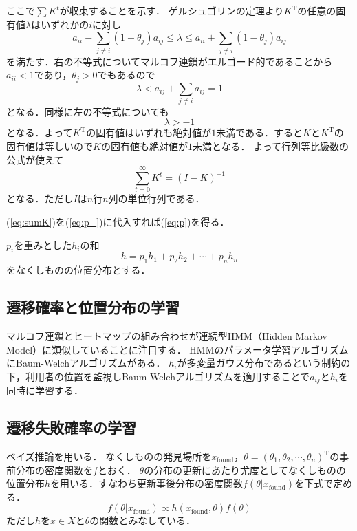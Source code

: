 \begin{theorem}
    ここで$ \sum K^t $が収束することを示す．
    ゲルシュゴリンの定理\cite{bib:s_saito}より$ K^\mathrm{T} $の任意の固有値$ \lambda $はいずれかの$ i $に対し
    \begin{equation*}
        a_{i i} - \sum_{j \ne i}(1 - \theta_j) a_{i j} \le \lambda \le a_{i i} + \sum_{j \ne i}(1 - \theta_j) a_{i j}
    \end{equation*}
    を満たす．右の不等式についてマルコフ連鎖がエルゴード的であることから$ a_{i i} < 1 $\cite{bib:funaki}であり，$ \theta_j > 0 $でもあるので
    \begin{equation*}
        \lambda < a_{i j} + \sum_{j \ne i} a_{i j} = 1
    \end{equation*}
    となる．同様に左の不等式についても
    \begin{equation*}
        \lambda > -1
    \end{equation*}
    となる．よって$ K^\mathrm{T} $の固有値はいずれも絶対値が$ 1 $未満である．すると$ K $と$ K^\mathrm{T} $の固有値は等しいので$ K $の固有値も絶対値が$ 1 $未満となる．
    よって行列等比級数の公式\cite{bib:m_saito}が使えて
    \begin{equation} \label{eq:sumK}
        \sum_{t=0}^{\infty} K^t = (I - K)^{-1}
    \end{equation}
    となる．ただし$ I $は$ n $行$ n $列の単位行列である．

    (\ref{eq:sumK})を(\ref{eq:p_})に代入すれば(\ref{eq:p})を得る．\QED
\end{theorem}

$ p_i $を重みとした$ h_i $の和
\begin{equation} \label{eq:h}
    h = p_1 h_1 + p_2 h_2 + \cdots + p_n h_n
\end{equation}
をなくしものの位置分布とする．

\subsection{遷移確率と位置分布の学習}
マルコフ連鎖とヒートマップの組み合わせが連続型HMM（Hidden Markov Model）に類似していることに注目する．
HMMのパラメータ学習アルゴリズムにBaum-Welchアルゴリズムがある．\cite{bib:ishii_ueda}
$ h_i $が多変量ガウス分布であるという制約の下，利用者の位置を監視しBaum-Welchアルゴリズムを適用することで$ a_{i j} $と$ h_i $を同時に学習する．

\subsection{遷移失敗確率の学習} \label{ss:faultprob}
ベイズ推論を用いる．
なくしものの発見場所を$ x_{\mathrm{found}} $，$ \theta = (\theta_1 , \theta_2 , \cdots , \theta_n)^\mathrm{T} $の事前分布の密度関数を$ f $とおく．
$ \theta $の分布の更新にあたり尤度としてなくしものの位置分布$ h $を用いる．すなわち更新事後分布の密度関数$ f(\theta | x_{\mathrm{found}}) $を下式で定める．
\begin{equation} \label{eq:new_f}
    f(\theta | x_{\mathrm{found}}) \propto h(x_{\mathrm{found}} , \theta) f(\theta)
\end{equation}
ただし$ h $を$ x \in X $と$ \theta $の関数とみなしている．

